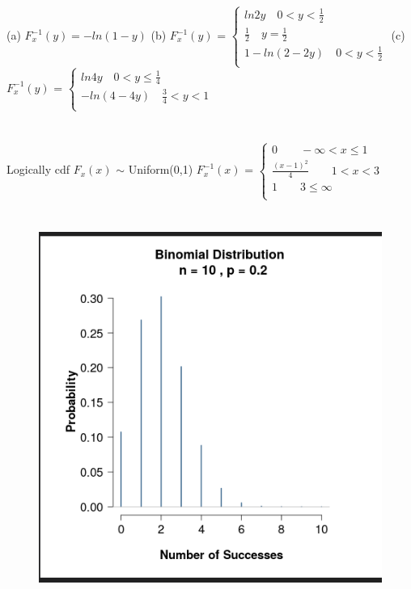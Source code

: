 \documentclass{report}
\begin{document}
\section{}
(a) {$F_{x}^{-1}(y) = -ln(1-y)$}
{\newline}
(b) {$F_{x}^{-1}(y)$} = $\begin{cases} 
	ln2y \quad 0 < y < \frac{1}{2}\\
	\frac{1}{2} \quad y = \frac{1}{2}\\
	1 - ln(2 - 2y) \quad 0 < y < \frac{1}{2}\\
\end{cases}$ 
{\newline}
(c) {$F_{x}^{-1}(y)$} = $\begin{cases} 
	ln4y \quad 0 < y \le \frac{1}{4}\\
	-ln(4 - 4y) \quad \frac{3}{4} < y < 1\\
\end{cases}$ 
{\newline}

\section{}
Logically cdf {$F_{x}(x)$} $\sim$ Uniform(0,1)
{$F_{x}^{-1}(x)$} = $\begin{cases} 
	0 \quad \quad -\infty < x \le 1\\
	\frac{(x-1)^{2}}{4} \quad \quad 1 < x < 3\\
	1 \quad \quad 3 \le \infty\\
\end{cases}$ 
{\newline}
\section{}

\begin{figure}
	\centering
	\includegraphics[width=0.7\linewidth]{screenshot001}
	\caption{}
	\label{fig:screenshot001}
\end{figure}
\end{document}
